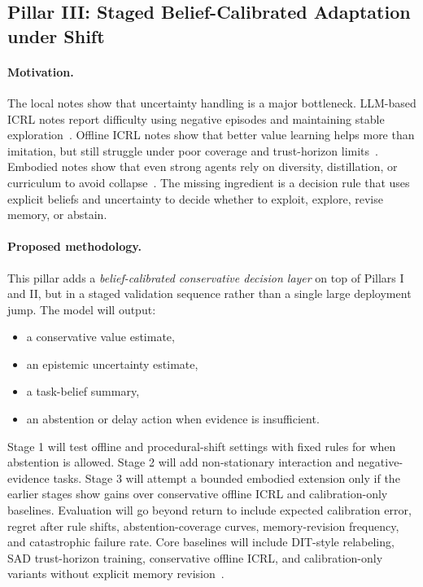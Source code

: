 \documentclass[10pt,twocolumn,letterpaper]{article}
\begin{document}
\subsection{Pillar III: Staged Belief-Calibrated Adaptation under Shift}
\paragraph{Motivation.}
The local notes show that uncertainty handling is a major bottleneck. LLM-based ICRL notes report difficulty using negative episodes and maintaining stable exploration~\cite{monea2024llms,krishnamurthy2024explore,nie2024evolve}. Offline ICRL notes show that better value learning helps more than imitation, but still struggle under poor coverage and trust-horizon limits~\cite{dong2024sad,tarasov2025qlearning}. Embodied notes show that even strong agents rely on diversity, distillation, or curriculum to avoid collapse~\cite{adaptive2023ada,elawady2024relic}. The missing ingredient is a decision rule that uses explicit beliefs and uncertainty to decide whether to exploit, explore, revise memory, or abstain.

\paragraph{Proposed methodology.}
This pillar adds a \emph{belief-calibrated conservative decision layer} on top of Pillars I and II, but in a staged validation sequence rather than a single large deployment jump. The model will output:
\begin{itemize}[leftmargin=1.2em]
\item a conservative value estimate,
\item an epistemic uncertainty estimate,
\item a task-belief summary,
\item an abstention or delay action when evidence is insufficient.
\end{itemize}
Stage 1 will test offline and procedural-shift settings with fixed rules for when abstention is allowed. Stage 2 will add non-stationary interaction and negative-evidence tasks. Stage 3 will attempt a bounded embodied extension only if the earlier stages show gains over conservative offline ICRL and calibration-only baselines. Evaluation will go beyond return to include expected calibration error, regret after rule shifts, abstention-coverage curves, memory-revision frequency, and catastrophic failure rate. Core baselines will include DIT-style relabeling, SAD trust-horizon training, conservative offline ICRL, and calibration-only variants without explicit memory revision~\cite{dong2024dit,dong2024sad,tarasov2025qlearning}.
\end{document}
